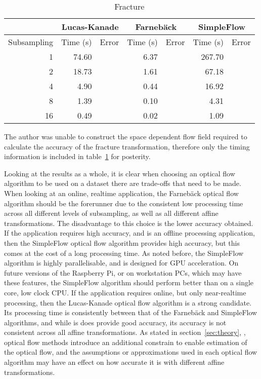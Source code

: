 \begin{table}[htbp]
  \centering
  \begin{tabular}{r|rr|rr|rr}
    \toprule
    & \multicolumn{2}{c}{Lucas-Kanade} & \multicolumn{2}{c}{Farnebäck} & \multicolumn{2}{c}{SimpleFlow} \\
    \midrule
    Subsampling & Time (s) & Error & Time (s) & Error & Time (s) & Error \\
    \midrule
    1 & 74.60 &       & 6.37  &       & 267.70 &  \\
    2 & 18.73 &       & 1.61  &       & 67.18 &  \\
    4 & 4.90  &       & 0.44  &       & 16.92 &  \\
    8 & 1.39  &       & 0.10  &       & 4.31  &  \\
    16 & 0.49  &       & 0.02  &       & 1.09  &  \\
    \bottomrule
  \end{tabular}
  \caption{Fracture}
  \label{tab:fracture}
\end{table}

The author was unable to construct the space dependent flow field required to calculate the accuracy of the fracture transformation, therefore only the timing information is included in table~\ref{tab:fracture} for posterity.
 
Looking at the results as a whole, it is clear when choosing an optical flow algorithm to be used on a dataset there are trade-offs that need to be made. When looking at an online, realtime application, the Farnebäck optical flow algorithm should be the forerunner due to the consistent low processing time across all different levels of subsampling, as well as all different affine transformations. The disadvantage to this choice is the lower accuracy obtained. If the application requires high accuracy, and is an offline processing application, then the SimpleFlow optical flow algorithm provides high accuracy, but this comes at the cost of a long processing time. As noted before, the SimpleFlow algorithm is highly parallelisable, and is designed for GPU acceleration. On future versions of the Raspberry Pi, or on workstation PCs, which may have these features, the SimpleFlow algorithm should perform better than on a single core, low clock CPU. If the application requires online, but only near-realtime processing, then the Lucas-Kanade optical flow algorithm is a strong candidate. Its processing time is consistently between that of the Farnebäck and SimpleFlow algorithms, and while is does provide good accuracy, its accuracy is not consistent across all affine transformations. As stated in section~\ref{sec:theory}, , optical flow methods introduce an additional constrain to enable estimation of the optical flow, and the assumptions or approximations used in each optical flow algorithm may have an effect on how accurate it is with different affine transformations.
 
